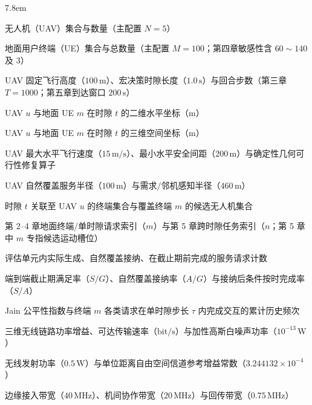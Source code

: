 \begin{notation}
  \begin{notationlist}{7.8em}
    \item[$\mathcal{U},\ N$] 无人机（UAV）集合与数量（主配置 $N=5$）
    \item[$\mathcal{I},\ M$] 地面用户终端（UE）集合与总数量（主配置 $M=100$；第四章敏感性含 $60\sim 140$ 及 $3$）
    \item[$H,\ \tau,\ T$] UAV 固定飞行高度（$100\,\mathrm{m}$）、宏决策时隙长度（$1.0\,\mathrm{s}$）与回合步数（第三章 $T=1000$；第五章到达窗口 $200\,\mathrm{s}$）
    \item[$\mathbf{q}_u(t),\ \mathbf{w}_m(t)$] UAV $u$ 与地面 UE $m$ 在时隙 $t$ 的二维水平坐标（$\mathrm{m}$）
    \item[$\mathbf{p}_u(t),\ \mathbf{p}_m(t)$] UAV $u$ 与地面 UE $m$ 在时隙 $t$ 的三维空间坐标（$\mathrm{m}$）
    \item[$v_{\max},\ d_{\min},\ \mathcal{E}(\cdot)$] UAV 最大水平飞行速度（$15\,\mathrm{m/s}$）、最小水平安全间距（$200\,\mathrm{m}$）与确定性几何可行性修复算子
    \item[$R_c,\ R_s$] UAV 自然覆盖服务半径（$100\,\mathrm{m}$）与需求/邻机感知半径（$460\,\mathrm{m}$）
    \item[$\mathcal{U}_u(t),\ \mathcal{C}_m^{\mathrm{cov}}(t)$] 时隙 $t$ 关联至 UAV $u$ 的终端集合与覆盖终端 $m$ 的候选无人机集合
    \item[$m,\ n$] 第 2--4 章地面终端/单时隙请求索引（$m$）与第 5 章跨时隙任务索引（$n$；第 5 章中 $m$ 专指候选运动槽位）
    \item[$G,\ A,\ S$] 评估单元内实际生成、自然覆盖接纳、在截止期前完成的服务请求计数
    \item[$\mathrm{DSR},\ \alpha,\ \eta$] 端到端截止期满足率（$S/G$）、自然覆盖接纳率（$A/G$）与接纳后条件按时完成率（$S/A$）
    \item[$J,\ c_m(t)$] Jain 公平性指数与终端 $m$ 各类请求在单时隙步长 $\tau$ 内完成交互的累计历史频次
    \item[$g_{ij}(t),\ R,\ \sigma^2$] 三维无线链路功率增益、可达传输速率（$\mathrm{bit/s}$）与加性高斯白噪声功率（$10^{-13}\,\mathrm{W}$）
    \item[$P^{\mathrm{comm}},\ G_0g_0$] 无线发射功率（$0.5\,\mathrm{W}$）与单位距离自由空间信道参考增益常数（$3.244132\times 10^{-4}$）
    \item[$B^{\mathrm{edge}},\ B^{\mathrm{inter}},\ B^{\mathrm{bh}}$] 边缘接入带宽（$40\,\mathrm{MHz}$）、机间协作带宽（$20\,\mathrm{MHz}$）与回传带宽（$0.75\,\mathrm{MHz}$）

\end{notationlist}
\end{notation}
